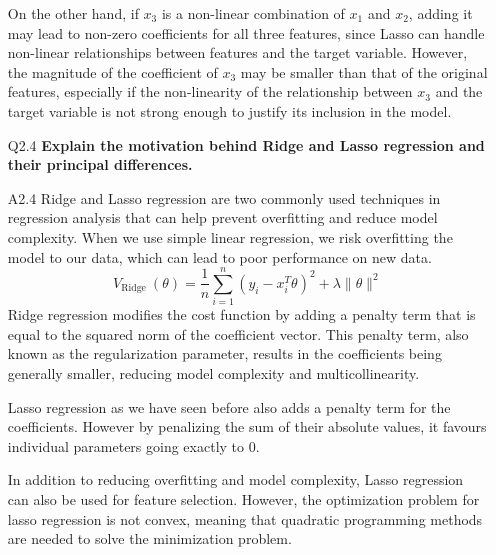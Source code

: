 \documentclass[tikz,14pt,fleqn]{article}
\begin{document}
\begin{itemize}
On the other hand, if $x_3$ is a non-linear combination of $x_1$ and $x_2$, adding it may lead to non-zero coefficients for all three features, since Lasso can handle non-linear relationships between features and the target variable. However, the magnitude of the coefficient of $x_3$ may be smaller than that of the original features, especially if the non-linearity of the relationship between $x_3$ and the target variable is not strong enough to justify its inclusion in the model.

\item[Q2.4] \textbf{Explain the motivation behind Ridge and Lasso regression and their principal differences.}
\item[A2.4] Ridge and Lasso regression are two commonly used techniques in regression analysis that can help prevent overfitting and reduce model complexity. When we use simple linear regression, we risk overfitting the model to our data, which can lead to poor performance on new data.
$$
V_{\text {Ridge }}(\theta)=\frac{1}{n} \sum_{i=1}^n\left(y_i-x_i^T \theta\right)^2+\lambda\|\theta\|^2
$$
Ridge regression modifies the cost function by adding a penalty term that is equal to the squared norm of the coefficient vector. This penalty term, also known as the regularization parameter, results in the coefficients being generally smaller, reducing model complexity and multicollinearity.

Lasso regression as we have seen before also adds a penalty term for the coefficients. However by penalizing the sum of their absolute values, it favours individual parameters going exactly to 0.

In addition to reducing overfitting and model complexity, Lasso regression can also be used for feature selection. However, the optimization problem for lasso regression is not convex, meaning that quadratic programming methods are needed to solve the minimization problem.
\end{itemize}
\end{document}
